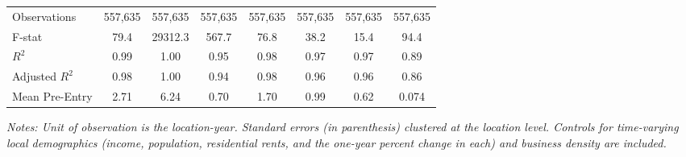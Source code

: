 \begin{table}[ht]
{\begin{threeparttable}
\begin{tabular}{l*{7}{c}}
\hline
Observations    &  557,635         &  557,635         &  557,635         &  557,635         &  557,635         &  557,635         &  557,635         \\
F-stat          &     79.4         &  29312.3         &    567.7         &     76.8         &     38.2         &     15.4         &     94.4         \\
\(R^{2}\)       &     0.99         &     1.00         &     0.95         &     0.98         &     0.97         &     0.97         &     0.89         \\
Adjusted \(R^{2}\)&     0.98         &     1.00         &     0.94         &     0.98         &     0.96         &     0.96         &     0.86         \\
Mean Pre-Entry  &     2.71         &     6.24         &     0.70         &     1.70         &     0.99         &     0.62         &    0.074         \\
\hline\hline
\end{tabular}

\begin{tablenotes}[flushleft]
\small 
\item \textit{Notes: Unit of observation is the location-year. Standard errors (in parenthesis) clustered at the location level. Controls for time-varying local demographics (income, population, residential rents, and the one-year percent change in each) and business density are included. }
\end{tablenotes}
\end{threeparttable}
}
\end{table}
